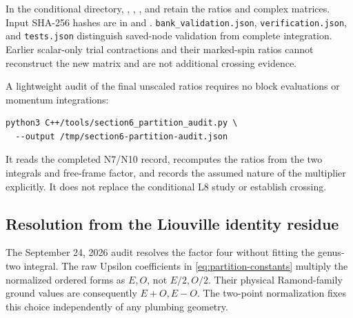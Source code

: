In the conditional directory, ,
, , and
 retain the ratios and complex matrices.
Input SHA-256 hashes are in  and
.
\texttt{bank\_validation.json}, \texttt{verification.json},
and \texttt{tests.json} distinguish saved-node validation
from complete integration. Earlier scalar-only trial
contractions and their marked-spin ratios cannot reconstruct
the new matrix and are not additional crossing evidence.

A lightweight audit of the final unscaled ratios requires no
block evaluations or momentum integrations:
\begin{verbatim}
python3 C++/tools/section6_partition_audit.py \
  --output /tmp/section6-partition-audit.json
\end{verbatim}
It reads the completed N7/N10 record, recomputes the ratios
from the two integrals and free-frame factor, and records
the assumed nature of the multiplier explicitly. It does
not replace the conditional L8 study or establish crossing.

\subsection{Resolution from the Liouville identity residue}
\label{app:partition-normalization-resolution}

The September 24, 2026 audit resolves the factor four without fitting
the genus-two integral. The raw Upsilon coefficients in
\eqref{eq:partition-constants} multiply the normalized ordered forms
as $E,O$, not $E/2,O/2$. Their physical Ramond-family ground values
are consequently $E+O,E-O$. The two-point normalization fixes this
choice independently of any plumbing geometry.

